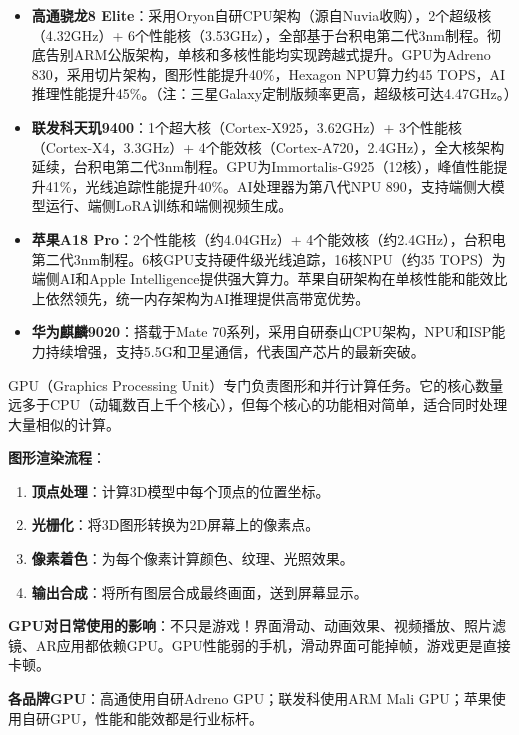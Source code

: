\begin{itemize}
  \item \textbf{高通骁龙8 Elite}：采用Oryon自研CPU架构（源自Nuvia收购），2个超级核（4.32GHz）+ 6个性能核（3.53GHz），全部基于台积电第二代3nm制程。彻底告别ARM公版架构，单核和多核性能均实现跨越式提升。GPU为Adreno 830，采用切片架构，图形性能提升40\%，Hexagon NPU算力约45 TOPS，AI推理性能提升45\%。（注：三星Galaxy定制版频率更高，超级核可达4.47GHz。）
  \item \textbf{联发科天玑9400}：1个超大核（Cortex-X925，3.62GHz）+ 3个性能核（Cortex-X4，3.3GHz）+ 4个能效核（Cortex-A720，2.4GHz），全大核架构延续，台积电第二代3nm制程。GPU为Immortalis-G925（12核），峰值性能提升41\%，光线追踪性能提升40\%。AI处理器为第八代NPU 890，支持端侧大模型运行、端侧LoRA训练和端侧视频生成。
  \item \textbf{苹果A18 Pro}：2个性能核（约4.04GHz）+ 4个能效核（约2.4GHz），台积电第二代3nm制程。6核GPU支持硬件级光线追踪，16核NPU（约35 TOPS）为端侧AI和Apple Intelligence提供强大算力。苹果自研架构在单核性能和能效比上依然领先，统一内存架构为AI推理提供高带宽优势。
  \item \textbf{华为麒麟9020}：搭载于Mate 70系列，采用自研泰山CPU架构，NPU和ISP能力持续增强，支持5.5G和卫星通信，代表国产芯片的最新突破。
\end{itemize}


GPU（Graphics Processing Unit）专门负责图形和并行计算任务。它的核心数量远多于CPU（动辄数百上千个核心），但每个核心的功能相对简单，适合同时处理大量相似的计算。

\textbf{图形渲染流程}：

\begin{enumerate}
  \item \textbf{顶点处理}：计算3D模型中每个顶点的位置坐标。
  \item \textbf{光栅化}：将3D图形转换为2D屏幕上的像素点。
  \item \textbf{像素着色}：为每个像素计算颜色、纹理、光照效果。
  \item \textbf{输出合成}：将所有图层合成最终画面，送到屏幕显示。
\end{enumerate}

\textbf{GPU对日常使用的影响}：不只是游戏！界面滑动、动画效果、视频播放、照片滤镜、AR应用都依赖GPU。GPU性能弱的手机，滑动界面可能掉帧，游戏更是直接卡顿。

\textbf{各品牌GPU}：高通使用自研Adreno GPU；联发科使用ARM Mali GPU；苹果使用自研GPU，性能和能效都是行业标杆。

